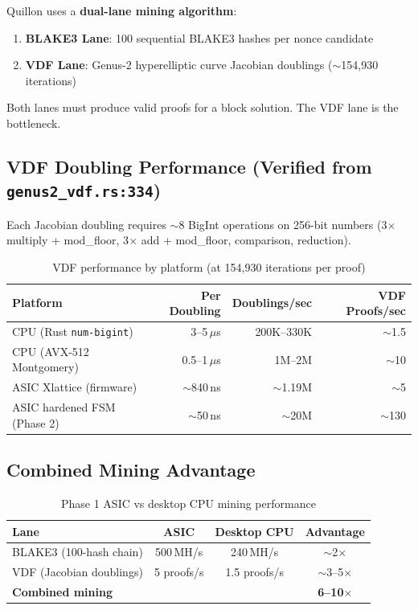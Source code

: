 \documentclass[11pt,a4paper]{article}
\begin{document}
Quillon uses a \textbf{dual-lane mining algorithm}:
\begin{enumerate}
    \item \textbf{BLAKE3 Lane}: 100 sequential BLAKE3 hashes per nonce candidate
    \item \textbf{VDF Lane}: Genus-2 hyperelliptic curve Jacobian doublings ($\sim$154,930 iterations)
\end{enumerate}

Both lanes must produce valid proofs for a block solution. The VDF lane is the bottleneck.

\subsection{VDF Doubling Performance (Verified from \texttt{genus2\_vdf.rs:334})}

Each Jacobian doubling requires $\sim$8 BigInt operations on 256-bit numbers (3$\times$ multiply + mod\_floor, 3$\times$ add + mod\_floor, comparison, reduction).

\begin{table}[h]
\centering
\begin{tabular}{lrrr}
\toprule
\textbf{Platform} & \textbf{Per Doubling} & \textbf{Doublings/sec} & \textbf{VDF Proofs/sec} \\
\midrule
CPU (Rust \texttt{num-bigint}) & 3--5\,$\mu$s & 200K--330K & $\sim$1.5 \\
CPU (AVX-512 Montgomery) & 0.5--1\,$\mu$s & 1M--2M & $\sim$10 \\
ASIC Xlattice (firmware) & $\sim$840\,ns & $\sim$1.19M & $\sim$5 \\
ASIC hardened FSM (Phase 2) & $\sim$50\,ns & $\sim$20M & $\sim$130 \\
\bottomrule
\end{tabular}
\caption{VDF performance by platform (at 154,930 iterations per proof)}
\end{table}

\subsection{Combined Mining Advantage}

\begin{table}[h]
\centering
\begin{tabular}{lccc}
\toprule
\textbf{Lane} & \textbf{ASIC} & \textbf{Desktop CPU} & \textbf{Advantage} \\
\midrule
BLAKE3 (100-hash chain) & 500\,MH/s & 240\,MH/s & $\sim$2$\times$ \\
VDF (Jacobian doublings) & 5 proofs/s & 1.5 proofs/s & $\sim$3--5$\times$ \\
\midrule
\textbf{Combined mining} & & & \textbf{6--10$\times$} \\
\bottomrule
\end{tabular}
\caption{Phase 1 ASIC vs desktop CPU mining performance}
\end{table}
\end{document}
